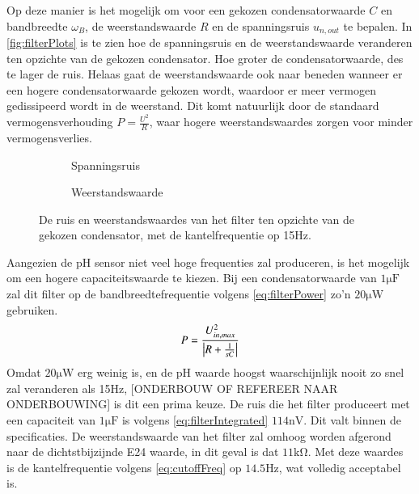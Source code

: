 Op deze manier is het mogelijk om voor een gekozen condensatorwaarde $C$ en bandbreedte $\omega_B$, de weerstandswaarde $R$ en de spanningsruis $u_{n,out}$ te bepalen.
In \autoref{fig:filterPlots} is te zien hoe de spanningsruis en de weerstandswaarde veranderen ten opzichte van de gekozen condensator. Hoe groter de condensatorwaarde, des te lager de ruis. Helaas gaat de weerstandswaarde ook naar beneden wanneer er een hogere condensatorwaarde gekozen wordt, waardoor er meer vermogen gedissipeerd wordt in de weerstand. Dit komt natuurlijk door de standaard vermogensverhouding $P = \frac{U^2}{R}$, waar hogere weerstandswaardes zorgen voor minder vermogensverlies. 

\begin{figure}
    \centering
    \begin{subfigure}[b]{0.45\textwidth}
        \centering
        
        \caption{Spanningsruis}
        \label{fig:filterVoltageNoisePlot}
    \end{subfigure}
    \hfill
    \begin{subfigure}[b]{0.45\textwidth}
        \centering
        
        \caption{Weerstandswaarde}
        \label{fig:filterResistorPlot}
    \end{subfigure}
    \caption{De ruis en weerstandswaardes van het filter ten opzichte van de gekozen condensator, met de kantelfrequentie op 15Hz.}
    \label{fig:filterPlots}
\end{figure}

Aangezien de pH sensor niet veel hoge frequenties zal produceren, is het mogelijk om een hogere capaciteitswaarde te kiezen.
Bij een condensatorwaarde van $1\si{\micro\farad}$ zal dit filter op de bandbreedtefrequentie volgens \autoref{eq:filterPower} zo'n $20\si{\micro\watt}$ gebruiken.
\begin{equation} \label{eq:filterPower}
    P = \frac{U_{in,max}^2}{\left|R + \frac{1}{sC}\right|}
    \tagaddtext{[\si{\watt}]}
\end{equation}
Omdat $20\si{\micro\watt}$ erg weinig is, en de pH waarde hoogst waarschijnlijk nooit zo snel zal veranderen als 15Hz, [ONDERBOUW OF REFEREER NAAR ONDERBOUWING] is dit een prima keuze. De ruis die het filter produceert met een capaciteit van $1\si{\micro\farad}$ is volgens \autoref{eq:filterIntegrated} $114\si{\nano\volt}$. Dit valt binnen de specificaties.
De weerstandswaarde van het filter zal omhoog worden afgerond naar de dichtstbijzijnde E24 waarde, in dit geval is dat $11\si{\kilo\ohm}$.
Met deze waardes is de kantelfrequentie volgens \autoref{eq:cutoffFreq} op $14.5\si{\hertz}$, wat volledig acceptabel is.